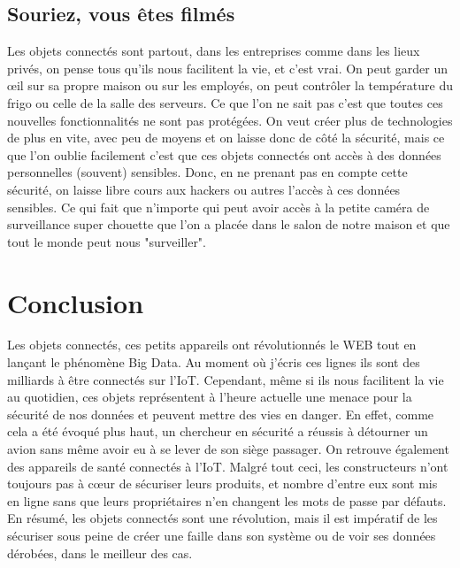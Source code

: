 \documentclass[a4paper]{report}
\begin{document}
	\subsection{Souriez, vous êtes filmés}
	Les objets connectés sont partout, dans les entreprises comme dans les lieux privés, on pense tous qu'ils nous facilitent la vie, 
	et c'est vrai. On peut garder un œil sur sa propre maison ou sur les employés, on peut contrôler la température du frigo ou celle 
	de la salle des serveurs. Ce que l'on ne sait pas c'est que toutes ces nouvelles fonctionnalités ne sont pas protégées. On veut créer 
	plus de technologies de plus en vite, avec peu de moyens et on laisse donc de côté la sécurité, mais ce que l'on oublie facilement 
	c'est que ces objets connectés ont accès à des données personnelles (souvent) sensibles. Donc, en ne prenant pas en compte cette sécurité,
	on laisse libre cours aux hackers ou autres l'accès à ces données sensibles. Ce qui fait que n'importe qui peut avoir accès à la petite
	caméra de surveillance super chouette que l'on a placée dans le salon de notre maison et que tout le monde peut nous "surveiller".  
	
	\section{Conclusion}
	
	Les objets connectés, ces petits appareils ont révolutionnés le WEB tout en lançant le phénomène Big Data. Au moment où j'écris ces
	lignes ils sont des milliards à être connectés sur l'IoT. Cependant, même si ils nous facilitent la vie au quotidien, ces objets
	représentent à l'heure actuelle une menace pour la sécurité de nos données et peuvent mettre des vies en danger. En effet, comme cela
	a été évoqué plus haut, un chercheur en sécurité a réussis à détourner un avion sans même avoir eu à se lever de son siège passager. On
	retrouve également des appareils de santé connectés à l'IoT. Malgré tout ceci, les constructeurs n'ont toujours pas à cœur de sécuriser
	leurs produits, et nombre d'entre eux sont mis en ligne sans que leurs propriétaires n'en changent les mots de passe par défauts.\\
	En résumé, les objets connectés sont une révolution, mais il est impératif de les sécuriser sous peine de créer une faille dans son système
	ou de voir ses données dérobées, dans le meilleur des cas.
	
	\newpage
\end{document}
